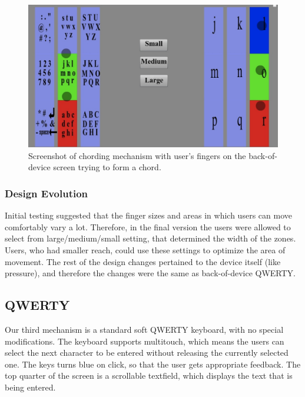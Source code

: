 \begin{figure}
    \includegraphics[scale=0.45]{Figures/chording.pdf} 
    \caption{Screenshot of chording mechanism with user's fingers on
      the back-of-device screen trying to form a chord.}
       \label{fig:chording_example}
\end{figure} 

\subsubsection{Design Evolution}

Initial testing suggested that the finger sizes and areas in which
users can move comfortably vary a lot. Therefore, in the final version
the users were allowed to select from large/medium/small setting, that
determined the width of the zones. Users, who had smaller reach, could
use these settings to optimize the area of movement. The rest of the
design changes pertained to the device itself (like pressure), and
therefore the changes were the same as back-of-device QWERTY.

\subsection{QWERTY}

Our third mechanism is a standard soft QWERTY keyboard, with no special modifications. The keyboard supports multitouch, which means the users can select the next character to be entered without releasing the currently selected one. The keys turns blue on click, so that the user gets appropriate feedback. The top quarter of the screen is a scrollable textfield, which displays the text that is being entered.
